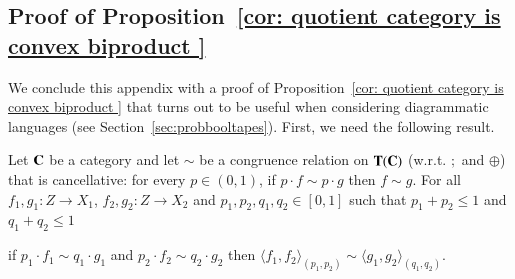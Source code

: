\subsection{Proof of Proposition~\ref{cor: quotient category is convex biproduct }}
We conclude this appendix with a proof of Proposition~\ref{cor: quotient category is convex biproduct } that turns out to be useful when considering diagrammatic languages (see Section~\ref{sec:probbooltapes}). First, we need the following result.

\begin{lemma}\label{lemma: convex products quoziente}
Let $\mathbf{C}$ be a category and let $\sim$  be a congruence relation on $\mathbf{T}(\mathbf{C})$ (w.r.t. $;$ and $\oplus$) that is cancellative: for every $p\in (0,1)$, if $p\cdot f\sim p\cdot g$ then $f\sim g$. For all $f_1,g_1\colon Z\to X_1$, $f_2,g_2\colon Z\to X_2$ and $p_1,p_2,q_1,q_2\in[0,1]$ such that $p_1+p_2\le 1$ and $q_1+q_2\le 1$
\begin{center}if $p_1\cdot f_1 \sim q_1\cdot g_1$ and $p_2\cdot f_2\sim q_2\cdot g_2$  then $\langle f_1,f_2\rangle_{(p_1,p_2)}\sim\langle g_1,g_2\rangle_{(q_1,q_2)}$.\end{center}
\end{lemma}

